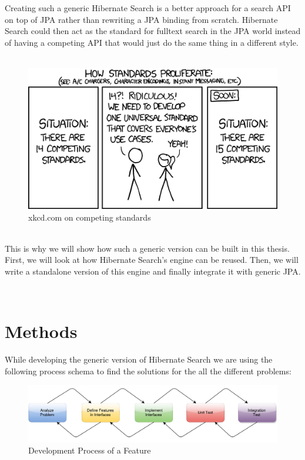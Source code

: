 \pagebreak
\noindent
Creating such a generic Hibernate Search is a better approach for a search API on top of JPA rather than rewriting a JPA binding from scratch. Hibernate Search could then act as the standard for fulltext search in the JPA world instead of having a competing API that would just do the same thing in a different style.
\\\\
\begin{figure}[ht]
	\centering
	\includegraphics[scale=0.5]{images/competing_standards.png}
	\caption{xkcd.com on competing standards \protect\footnotemark}
	\label{xkcd_standards_fig}
\end{figure}
\\
This is why we will show how such a generic version can be built in this thesis. First, we will look at how Hibernate Search's engine can be reused. Then, we will write a standalone version of this engine and finally integrate it with generic JPA.

\pagebreak
~
\pagebreak

\section{Methods} \label{Methods}

While developing the generic version of Hibernate Search we are using the following process schema to find the solutions for the all the different problems:

\begin{figure}[ht]
	\centering
	\includegraphics[scale=0.52]{images/work_process.pdf}
	\caption{Development Process of a Feature}
	\label{development_process_of_a_feature}
\end{figure}

